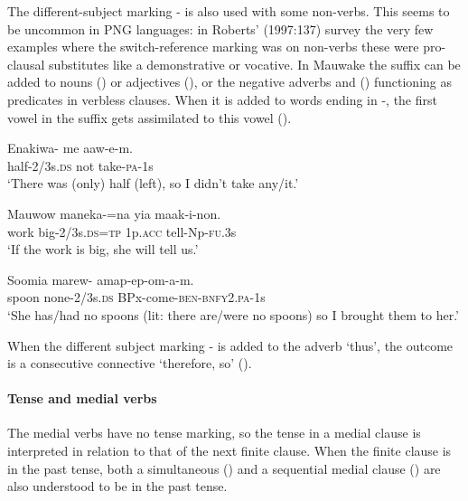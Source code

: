 The different-subject marking \nobreakdash- is also used with some non-verbs. This seems to be uncommon in PNG languages: in Roberts' (1997:137) survey the very few examples where the switch-reference marking was on non-verbs these were pro-clausal substitutes like a demonstrative or vocative. In Mauwake the  suffix can be added to nouns () or adjectives (), or the negative adverbs  and  () functioning as predicates in verbless clauses. When it is added to words ending in -, the first vowel in the suffix gets assimilated to this vowel ().

\ea%
\label{ex:x250}
\gll Enakiwa- me aaw-e-m. \\
half-2/3s.\textsc{ds} not take-\textsc{pa}-1s \\
\glt`There was (only) half (left), so I didn't take any/it.'
\z

\ea%
\label{ex:x251}
\gll Mauwow maneka-=na yia maak-i-non. \\
work big-2/3s.\textsc{ds}=\textsc{tp} 1p.\textsc{acc} tell-Np-\textsc{fu}.3s \\
\glt`If the work is big, she will tell us.'
\z

\ea%
\label{ex:x252}
\gll Soomia marew- amap-ep-om-a-m. \\
spoon none-2/3s.\textsc{ds} BPx-come-\textsc{ben}-\textsc{bnfy}2.\textsc{pa}-1s \\
\glt`She has/had no spoons (lit: there are/were no spoons) so I brought them to her.'
\z

When the different subject marking \nobreakdash- is added to the adverb  `thus', the outcome is a consecutive connective `therefore, so' ().

\paragraph[Tense and medial verbs]{Tense and medial verbs}
{}
The medial verbs have no tense marking, so the tense in a medial clause is interpreted in relation to that of the next finite clause. When the finite clause is in the past tense, both a simultaneous () and a sequential medial clause () are also understood to be in the past tense.


